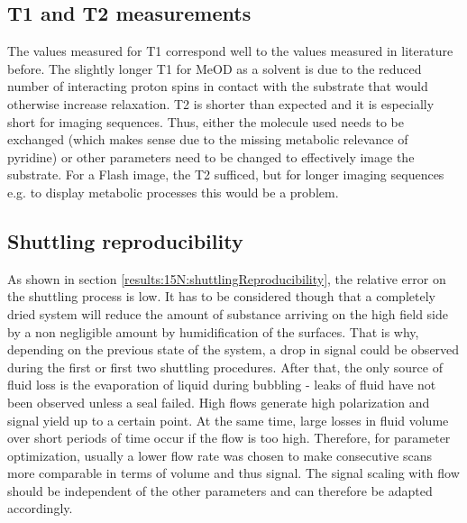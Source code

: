         \subsection{T1 and T2 measurements}
        The values measured for T1 correspond well to the values measured in literature before. The slightly longer T1 for MeOD as a solvent is due to the reduced number of interacting proton spins in contact with the substrate that would otherwise increase relaxation. T2 is shorter than expected and it is especially short for imaging sequences. Thus, either the molecule used needs to be exchanged (which makes sense due to the missing metabolic relevance of pyridine) or other parameters need to be changed to effectively image the substrate. For a Flash image, the T2 sufficed, but for longer imaging sequences e.g. to display  metabolic processes this would be a problem.
        \subsection{Shuttling reproducibility}
            As shown in section \ref{results:15N:shuttlingReproducibility}, the relative error on the shuttling process is low. It has to be considered though that a completely dried system will reduce the amount of substance arriving on the high field side by a non negligible amount by humidification of the surfaces. That is why, depending on the previous state of the system, a drop in signal could be observed during the first or first two shuttling procedures. After that, the only source of fluid loss is the evaporation of liquid during bubbling - leaks of fluid have not been observed unless a seal failed. High flows generate high polarization  and signal yield up to a certain point. At the same time, large losses in fluid volume over short periods of time occur if the flow is too high. Therefore, for parameter optimization, usually  a lower flow rate was chosen to make consecutive scans more comparable in terms of volume and thus signal. The signal scaling with flow should be independent of the other parameters and can therefore be adapted accordingly.
